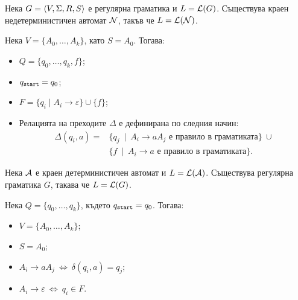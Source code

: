 \begin{prop}
  Нека $G = \langle{V,\Sigma,R,S}\rangle$ е регулярна граматика и $L = \mathcal{L}(G)$.
  Съществува краен недетерминистичен автомат $\mathcal{N}$, такъв че $L = \mathcal{L}(\mathcal{N})$.
\end{prop}
\begin{hint}
  Нека $V = \{A_0,\dots,A_k\}$, като $S = A_0$. Тогава:
  \begin{itemize}
  \item
    $Q = \{q_0,\dots,q_k,f\}$;
  \item
    $q_{\texttt{start}} = q_0$;
  \item
    $F = \{q_i \mid A_i \to \varepsilon\} \cup \{f\}$;
  \item
    Релацията на преходите $\Delta$ е дефинирана по следния начин:
    \begin{align*}
      \Delta(q_i,a) = & \{ q_j\ \mid\ A_i \to aA_j \text{ е правило в граматиката}\}\ \cup\\
                      & \{ f\ \mid\ A_i \to a \text{ е правило в граматиката}\}.
    \end{align*}
  \end{itemize}
\end{hint}

\begin{prop}
  Нека $\mathcal{A}$ е краен детерминистичен автомат и $L = \mathcal{L}(\mathcal{A})$.
  Съществува регулярна граматика $G$, такава че $L = \mathcal{L}(G)$.
\end{prop}
\begin{hint}
  Нека $Q = \{q_0,\dots,q_k\}$, където $q_{\texttt{start}} = q_0$. Тогава:
  \begin{itemize}
  \item 
    $V = \{A_0,\dots,A_k\}$;
  \item
    $S = A_0$;
  \item
    $A_i \to aA_j\ \iff\ \delta(q_i,a) = q_j$;
  \item
    $A_{i} \to \varepsilon\ \iff\ q_{i} \in F$.
  \end{itemize}
\end{hint}


